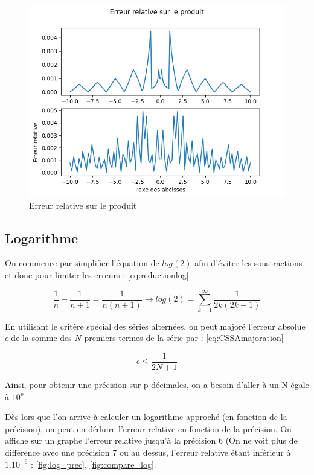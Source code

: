 \documentclass{article}
\begin{document}
\begin{figure}[ht]
    \centering
    \includegraphics[scale=0.6]{erreur_prod.png}
    \caption{Erreur relative sur le produit}
    \label{fig:erreur_prod}
\end{figure}


\subsection*{Logarithme}

On commence par simplifier l'équation de $log(2)$ afin d'éviter les soustractions et donc pour limiter les erreurs : \ref{eq:reductionlog}

\begin{equation}
\frac{1}{n}-\frac{1}{n+1}=\frac{1}{n(n+1)} \rightarrow log(2) = \sum_{k=1}^{\infty}\frac{1}{2k(2k-1)}
\label{eq:reductionlog}
\end{equation}

En utilisant le critère spécial des séries alternées, on peut majoré l'erreur absolue $\epsilon$ de la somme des $N$ premiers termes de la série par : \ref{eq:CSSAmajoration}  

\begin{equation}
    \epsilon \leq \frac{1}{2N+1}
    \label{eq:CSSAmajoration}
\end{equation}

Ainsi, pour obtenir une précision sur p décimales, on a besoin d'aller à un N égale à ${10^{p}}$. 


Dès lors que l'on arrive à calculer un logarithme approché (en fonction de la précision), on peut en déduire l'erreur relative en fonction de la précision. On affiche sur un graphe l'erreur relative jusqu'à la précision 6 (On ne voit plus de différence avec une précision 7 ou au dessus, l'erreur relative étant inférieur à ${1.10^{-6}}$ : \ref{fig:log_prec}, \ref{fig:compare_log}.
\end{document}
